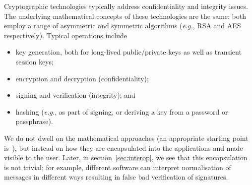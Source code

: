 \documentclass{article}
\def\cite{\citep}
\newcommand{\eg}{\textit{e.g.}}
\begin{document}
Cryptographic technologies typically address confidentiality and
integrity issues.  The underlying mathematical concepts of these
technologies are the same: both employ a range of asymmetric and
symmetric algorithms (\eg, RSA and AES respectively).  Typical operations include
\begin{itemize}
\item key generation, both for long-lived public/private keys as well as transient session keys;
\item encryption and decryption (confidentiality);
\item signing and verification (integrity); and
\item hashing (\eg, as part of signing, or deriving a key from a password or passphrase).
\end{itemize}
We do
not dwell on the mathematical approaches (an appropriate starting
point is~\cite{Schneier96}), but instead on how they are encapsulated
into the applications and made visible to the user.  
Later, in section~\ref{sec:interop}, we see that this encapsulation is not trivial;
for example, different software can interpret normalisation of messages in different ways resulting in false bad verification of signatures.
\end{document}
